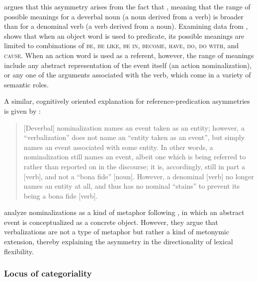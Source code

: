 \textcite{Kastovsky1996} argues that this asymmetry arises from the fact that , meaning that the range of possible meanings for a deverbal noun (a noun derived from a verb) is broader than for a denominal verb (a verb derived from a noun). Examining data from , \citeauthor{Kastovsky1996} shows that when an object word is used to predicate, its possible meanings are limited to combinations of \textsc{be}, \textsc{be like}, \textsc{be in}, \textsc{become}, \textsc{have}, \textsc{do}, \textsc{do with}, and \textsc{cause}. When an action word is used as a referent, however, the range of meanings include any abstract representation of the event itself (an action nominalization), or any one of the arguments associated with the verb, which come in a variety of semantic roles.

A similar, cognitively oriented explanation for reference-predication asymmetries is given by \textcite[745]{HopperThompson1984}:

\blockquote[{\cite[745]{HopperThompson1984}}]{[Deverbal] nominalization names an event taken as an entity; however, a \enquote{verbalization} does not name an \enquote{entity taken as an event}, but simply names an event associated with some entity. In other words, a nominalization still names an event, albeit one which is being referred to rather than reported on in the discourse; it is, accordingly, still in part a [verb], and not a \enquote{bona fide} [noun]. However, a denominal [verb] no longer names an entity at all, and thus has no nominal \enquote{stains} to prevent its being a bona fide [verb].}

\noindent\textcite[746]{HopperThompson1984} analyze nominalizations as a kind of metaphor following \textcite[3a]{LakoffJohnson1980}, in which an abstract event is conceptualized as a concrete object. However, they argue that verbalizations are not a type of metaphor but rather a kind of metonymic extension, thereby explaining the asymmetry in the directionality of lexical flexibility.

\subsubsection{Locus of categoriality}
\label{sec:2.3.2.3}

